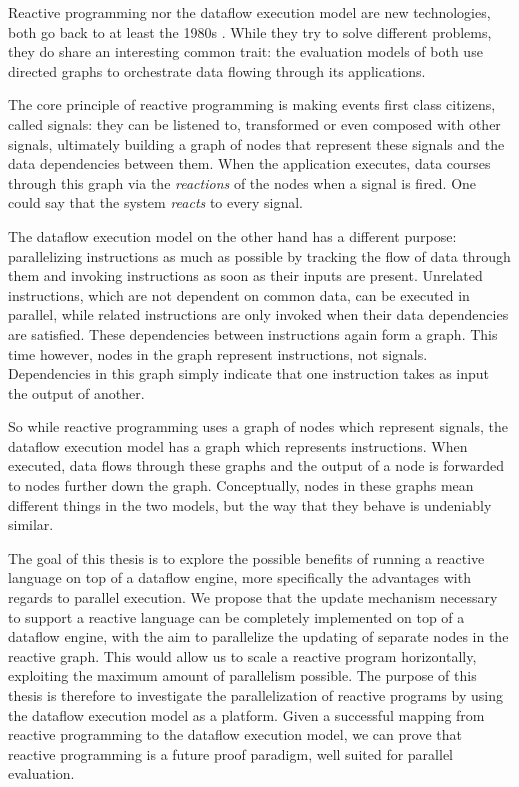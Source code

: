Reactive programming nor the dataflow execution model are new technologies, both go back to at least the 1980s \citep{harel_development_1985, veen_dataflow_1986}. While they try to solve different problems, they do share an interesting common trait: the evaluation models of both use directed graphs to orchestrate data flowing through its applications. 

The core principle of reactive programming is making events first class citizens, called signals: they can be listened to, transformed or even composed with other signals, ultimately building a graph of nodes that represent these signals and the data dependencies between them. When the application executes, data courses through this graph via the \textit{reactions} of the nodes when a signal is fired. One could say that the system \textit{reacts} to every signal.

The dataflow execution model on the other hand has a different purpose: parallelizing instructions as much as possible by tracking the flow of data through them and invoking instructions as soon as their inputs are present. Unrelated instructions, which are not dependent on common data, can be executed in parallel, while related instructions are only invoked when their data dependencies are satisfied. These dependencies between instructions again form a graph. This time however, nodes in the graph represent instructions, not signals. Dependencies in this graph simply indicate that one instruction takes as input the output of another. 

So while reactive programming uses a graph of nodes which represent signals, the dataflow execution model has a graph which represents instructions. When executed, data flows through these graphs and the output of a node is forwarded to nodes further down the graph. Conceptually, nodes in these graphs mean different things in the two models, but the way that they behave is undeniably similar.

The goal of this thesis is to explore the possible benefits of running a reactive language on top of a dataflow engine, more specifically the advantages with regards to parallel execution. We propose that the update mechanism necessary to support a reactive language can be completely implemented on top of a dataflow engine, with the aim to parallelize the updating of separate nodes in the reactive graph. 
This would allow us to scale a reactive program horizontally, exploiting the maximum amount of parallelism possible. The purpose of this thesis is therefore to investigate the parallelization of reactive programs by using the dataflow execution model as a platform. Given a successful mapping from reactive programming to the dataflow execution model, we can prove that reactive programming is a future proof paradigm, well suited for parallel evaluation. 


